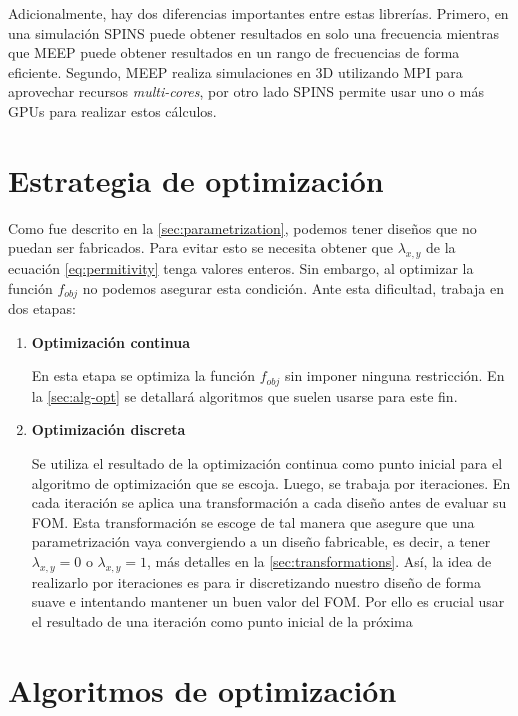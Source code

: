 Adicionalmente, hay dos diferencias importantes entre estas librerías.
Primero, en una simulación SPINS puede obtener resultados en solo una
frecuencia mientras que MEEP puede obtener resultados en un rango de
frecuencias de forma eficiente.
Segundo, MEEP realiza simulaciones en 3D utilizando MPI para aprovechar
recursos \emph{multi-cores}, por otro lado SPINS permite usar uno o más GPUs
para realizar estos cálculos.

\section{Estrategia de optimización}\label{sec:estrategia-optimizacion}

Como fue descrito en la \autoref{sec:parametrization}, podemos
tener diseños que no puedan ser fabricados.
Para evitar esto se necesita obtener que $\lambda_{x, y}$ de la ecuación \ref{eq:permitivity} tenga valores enteros.
Sin embargo, al optimizar la función $f_{obj}$ no podemos asegurar esta condición.
Ante esta dificultad, \cite{Su2020} trabaja en dos etapas:


\begin{enumerate}

\item{\textbf{Optimización continua}}

En esta etapa se optimiza la función $f_{obj}$ sin imponer ninguna restricción.
    En la \autoref{sec:alg-opt} se detallará algoritmos que suelen usarse para este fin.

\item{\textbf{Optimización discreta}}

Se utiliza el resultado de la optimización continua como punto inicial para el algoritmo de optimización que se escoja.
Luego, se trabaja por iteraciones.
En cada iteración se aplica una transformación a cada diseño antes de evaluar su FOM.
Esta transformación se escoge de tal manera que asegure que una
parametrización vaya convergiendo a un diseño fabricable, es decir,
a tener $\lambda_{x, y} = 0$ o $\lambda_{x, y} = 1$, más detalles en la \autoref{sec:transformations}.
Así, la idea de realizarlo por iteraciones es para ir discretizando nuestro diseño
de forma suave e intentando mantener un buen valor del FOM.
Por ello es crucial usar el resultado de una iteración como punto inicial de la próxima

\end{enumerate}

\section{Algoritmos de optimización}\label{sec:alg-opt}

